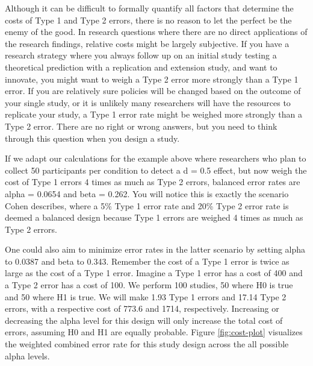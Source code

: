 \documentclass[
  english,
  ,man,floatsintext]{apa6}
\begin{document}
Although it can be difficult to formally quantify all factors that determine the costs of Type 1 and Type 2 errors, there is no reason to let the perfect be the enemy of the good. In research questions where there are no direct applications of the research findings, relative costs might be largely subjective. If you have a research strategy where you always follow up on an initial study testing a theoretical prediction with a replication and extension study, and want to innovate, you might want to weigh a Type 2 error more strongly than a Type 1 error. If you are relatively sure policies will be changed based on the outcome of your single study, or it is unlikely many researchers will have the resources to replicate your study, a Type 1 error rate might be weighed more strongly than a Type 2 error. There are no right or wrong answers, but you need to think through this question when you design a study.

If we adapt our calculations for the example above where researchers who plan to collect 50 participants per condition to detect a d = 0.5 effect, but now weigh the cost of Type 1 errors 4 times as much as Type 2 errors, balanced error rates are alpha = 0.0654 and beta = 0.262. You will notice this is exactly the scenario Cohen describes, where a 5\% Type 1 error rate and 20\% Type 2 error rate is deemed a balanced design because Type 1 errors are weighed 4 times as much as Type 2 errors.

One could also aim to minimize error rates in the latter scenario by setting alpha to 0.0387 and beta to 0.343. Remember the cost of a Type 1 error is twice as large as the cost of a Type 1 error. Imagine a Type 1 error has a cost of 400 and a Type 2 error has a cost of 100. We perform 100 studies, 50 where H0 is true and 50 where H1 is true. We will make 1.93 Type 1 errors and 17.14 Type 2 errors, with a respective cost of 773.6 and 1714, respectively. Increasing or decreasing the alpha level for this design will only increase the total cost of errors, assuming H0 and H1 are equally probable. Figure \ref{fig:cost-plot} visualizes the weighted combined error rate for this study design across the all possible alpha levels.
\end{document}
